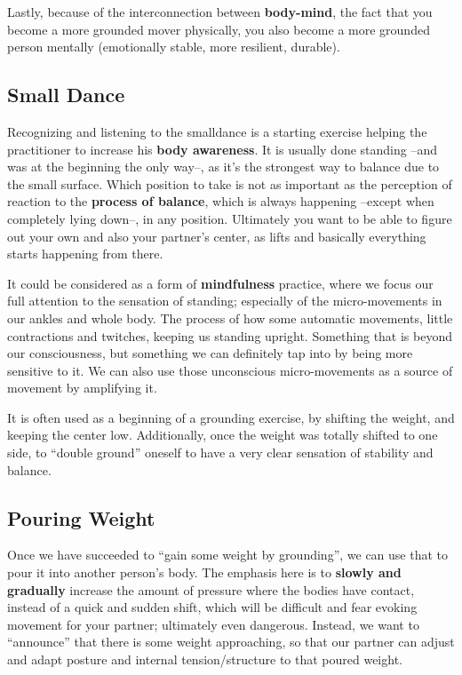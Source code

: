 Lastly, because of the interconnection between \textbf{body-mind}, the fact that you become a more grounded mover physically, you also become a more grounded person mentally (emotionally stable, more resilient, durable).

\subsection{Small Dance}\label{subsec:small-dance}

Recognizing and listening to the \gls{smalldance} is a starting exercise helping the practitioner to increase his \textbf{body awareness}.
It is usually done standing --and was at the beginning the only way--, as it's the strongest way to balance due to the small surface.
Which position to take is not as important as the perception of reaction to the \textbf{process of balance}, which is always happening --except when completely lying down--, in any position.
Ultimately you want to be able to figure out your own and also your partner's center, as lifts and basically everything starts happening from there.

It could be considered as a form of \textbf{mindfulness} practice, where we focus our full attention to the sensation of standing; especially of the micro-movements in our ankles and whole body.
The process of how some automatic movements, little contractions and twitches, keeping us standing upright.
Something that is beyond our consciousness, but something we can definitely tap into by being more sensitive to it.
We can also use those unconscious micro-movements as a source of movement by amplifying it.

It is often used as a beginning of a grounding exercise, by shifting the weight, and keeping the center low.
Additionally, once the weight was totally shifted to one side, to ``double ground'' oneself to have a very clear sensation of stability and balance.

\subsection{Pouring Weight}\label{subsec:pouring-weight}

Once we have succeeded to ``gain some weight by grounding'', we can use that to pour it into another person's body.
The emphasis here is to \textbf{slowly and gradually} increase the amount of pressure where the bodies have contact, instead of a quick and sudden shift, which will be difficult and fear evoking movement for your partner; ultimately even dangerous.
Instead, we want to ``announce'' that there is some weight approaching, so that our partner can adjust and adapt posture and internal tension/structure to that poured weight.

